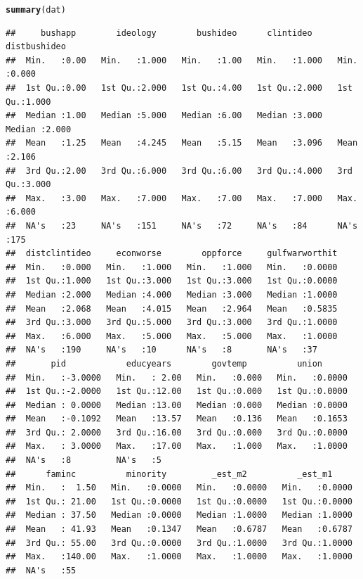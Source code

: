 \documentclass[onesided]{article}\usepackage[]{graphicx}\usepackage[]{color}
\makeatletter
\newcommand{\hlstd}[1]{\textcolor[rgb]{0.345,0.345,0.345}{#1}}%
\newcommand{\hlkwd}[1]{\textcolor[rgb]{0.737,0.353,0.396}{\textbf{#1}}}%
\newenvironment{kframe}{%
 \def\at@end@of@kframe{}%
 \ifinner\ifhmode%
  \def\at@end@of@kframe{\end{minipage}}%
  \begin{minipage}{\columnwidth}%
 \fi\fi%
 \def\FrameCommand##1{\hskip\@totalleftmargin \hskip-\fboxsep
 \colorbox{shadecolor}{##1}\hskip-\fboxsep
     \hskip-\linewidth \hskip-\@totalleftmargin \hskip\columnwidth}%
 \MakeFramed {\advance\hsize-\width
   \@totalleftmargin\z@ \linewidth\hsize
   \@setminipage}}%
 {\par\unskip\endMakeFramed%
 \at@end@of@kframe}
\newenvironment{knitrout}{}{} %
\makeatother
\begin{document}
\begin{knitrout}
\color{fgcolor}\begin{kframe}
\begin{alltt}
\hlkwd{summary}\hlstd{(dat)}
\end{alltt}
\begin{verbatim}
##     bushapp        ideology        bushideo      clintideo      distbushideo  
##  Min.   :0.00   Min.   :1.000   Min.   :1.00   Min.   :1.000   Min.   :0.000  
##  1st Qu.:0.00   1st Qu.:2.000   1st Qu.:4.00   1st Qu.:2.000   1st Qu.:1.000  
##  Median :1.00   Median :5.000   Median :6.00   Median :3.000   Median :2.000  
##  Mean   :1.25   Mean   :4.245   Mean   :5.15   Mean   :3.096   Mean   :2.106  
##  3rd Qu.:2.00   3rd Qu.:6.000   3rd Qu.:6.00   3rd Qu.:4.000   3rd Qu.:3.000  
##  Max.   :3.00   Max.   :7.000   Max.   :7.00   Max.   :7.000   Max.   :6.000  
##  NA's   :23     NA's   :151     NA's   :72     NA's   :84      NA's   :175    
##  distclintideo     econworse        oppforce     gulfwarworthit  
##  Min.   :0.000   Min.   :1.000   Min.   :1.000   Min.   :0.0000  
##  1st Qu.:1.000   1st Qu.:3.000   1st Qu.:3.000   1st Qu.:0.0000  
##  Median :2.000   Median :4.000   Median :3.000   Median :1.0000  
##  Mean   :2.068   Mean   :4.015   Mean   :2.964   Mean   :0.5835  
##  3rd Qu.:3.000   3rd Qu.:5.000   3rd Qu.:3.000   3rd Qu.:1.0000  
##  Max.   :6.000   Max.   :5.000   Max.   :5.000   Max.   :1.0000  
##  NA's   :190     NA's   :10      NA's   :8       NA's   :37      
##       pid            educyears        govtemp          union       
##  Min.   :-3.0000   Min.   : 2.00   Min.   :0.000   Min.   :0.0000  
##  1st Qu.:-2.0000   1st Qu.:12.00   1st Qu.:0.000   1st Qu.:0.0000  
##  Median : 0.0000   Median :13.00   Median :0.000   Median :0.0000  
##  Mean   :-0.1092   Mean   :13.57   Mean   :0.136   Mean   :0.1653  
##  3rd Qu.: 2.0000   3rd Qu.:16.00   3rd Qu.:0.000   3rd Qu.:0.0000  
##  Max.   : 3.0000   Max.   :17.00   Max.   :1.000   Max.   :1.0000  
##  NA's   :8         NA's   :5                                       
##      faminc          minority         _est_m2          _est_m1      
##  Min.   :  1.50   Min.   :0.0000   Min.   :0.0000   Min.   :0.0000  
##  1st Qu.: 21.00   1st Qu.:0.0000   1st Qu.:0.0000   1st Qu.:0.0000  
##  Median : 37.50   Median :0.0000   Median :1.0000   Median :1.0000  
##  Mean   : 41.93   Mean   :0.1347   Mean   :0.6787   Mean   :0.6787  
##  3rd Qu.: 55.00   3rd Qu.:0.0000   3rd Qu.:1.0000   3rd Qu.:1.0000  
##  Max.   :140.00   Max.   :1.0000   Max.   :1.0000   Max.   :1.0000  
##  NA's   :55
\end{verbatim}
\end{kframe}
\end{knitrout}
\end{document}
